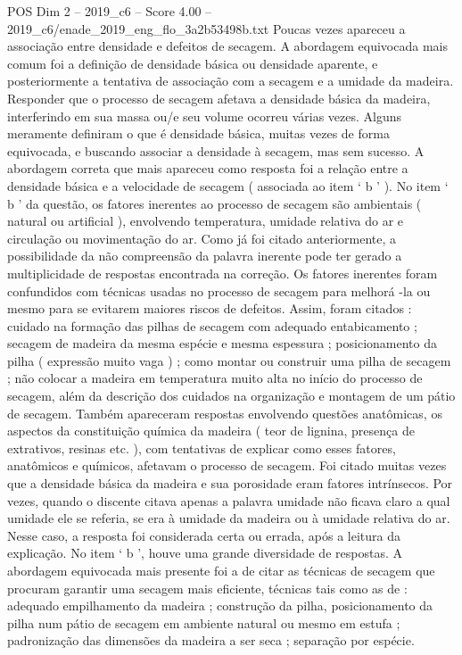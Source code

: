 \begin{textsample}{POS Dim 2 – 2019\_c6 – Score 4.00 – 2019\_c6/enade\_2019\_eng\_flo\_3a2b53498b.txt}
Poucas vezes apareceu a associação entre densidade e defeitos de secagem.
A abordagem equivocada mais comum foi a definição de densidade básica ou densidade aparente, e posteriormente a tentativa de associação com a secagem e a umidade da madeira.
Responder que o processo de secagem afetava a densidade básica da madeira, interferindo em sua massa ou/e seu volume ocorreu várias vezes.
Alguns meramente definiram o que é densidade básica, muitas vezes de forma equivocada, e buscando associar a densidade à secagem, mas sem sucesso.
A abordagem correta que mais apareceu como resposta foi a relação entre a densidade básica e a velocidade de secagem ( associada ao item ‘ b ’ ).
No item ‘ b ’ da questão, os fatores inerentes ao processo de secagem são ambientais ( natural ou artificial ), envolvendo temperatura, umidade relativa do ar e circulação ou movimentação do ar.
Como já foi citado anteriormente, a possibilidade da não compreensão da palavra inerente pode ter gerado a multiplicidade de respostas encontrada na correção.
Os fatores inerentes foram confundidos com técnicas usadas no processo de secagem para melhorá -la ou mesmo para se evitarem maiores riscos de defeitos.
Assim, foram citados : cuidado na formação das pilhas de secagem com adequado entabicamento ; secagem de madeira da mesma espécie e mesma espessura ; posicionamento da pilha ( expressão muito vaga ) ; como montar ou construir uma pilha de secagem ; não colocar a madeira em temperatura muito alta no início do processo de secagem, além da descrição dos cuidados na organização e montagem de um pátio de secagem.
Também apareceram respostas envolvendo questões anatômicas, os aspectos da constituição química da madeira ( teor de lignina, presença de extrativos, resinas etc. ), com tentativas de explicar como esses fatores, anatômicos e químicos, afetavam o processo de secagem.
Foi citado muitas vezes que a densidade básica da madeira e sua porosidade eram fatores intrínsecos.
Por vezes, quando o discente citava apenas a palavra umidade não ficava claro a qual umidade ele se referia, se era à umidade da madeira ou à umidade relativa do ar.
Nesse caso, a resposta foi considerada certa ou errada, após a leitura da explicação.
No item ‘ b ’, houve uma grande diversidade de respostas.
A abordagem equivocada mais presente foi a de citar as técnicas de secagem que procuram garantir uma secagem mais eficiente, técnicas tais como as de : adequado empilhamento da madeira ; construção da pilha, posicionamento da pilha num pátio de secagem em ambiente natural ou mesmo em estufa ; padronização das dimensões da madeira a ser seca ; separação por espécie.

\end{textsample}
